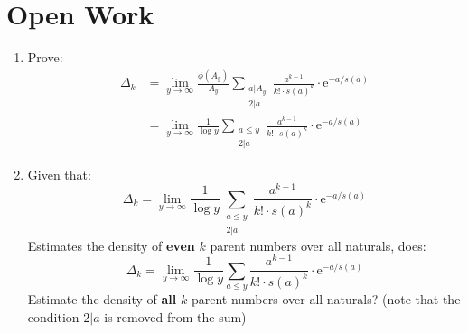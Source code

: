 \documentclass{article}
\theoremstyle{definition}
\begin{document}
\section{Open Work}
\begin{enumerate}
    \item Prove: \begin{align*}
              \Delta_k & = \lim_{y \to \infty} \frac{\phi(A_y)}{A_y} \sum_{\substack{a | A_y \\ 2 | a}} \frac{a^{k-1}}{k! \cdot s(a)^k} \cdot \text{e}^{-a/s(a)}\\
                       & = \lim_{y \to \infty} \frac{1}{\log y}\sum_{\substack{a\leq y       \\ 2 | a}} \frac{a^{k-1}}{k! \cdot s(a)^k} \cdot \text{e}^{-a/s(a)}
          \end{align*}

    \item Given that: $$\Delta_k = \lim_{y \to \infty} \frac{1}{\log y}\sum_{\substack{a\leq y \\ 2 | a}} \frac{a^{k-1}}{k! \cdot s(a)^k} \cdot \text{e}^{-a/s(a)}$$
          Estimates the density of \textbf{even} $k$ parent numbers over all naturals, does:$$\Delta_k = \lim_{y \to \infty} \frac{1}{\log y}\sum_{a\leq y} \frac{a^{k-1}}{k! \cdot s(a)^k} \cdot \text{e}^{-a/s(a)}$$ Estimate the density of \textbf{all} $k$-parent numbers over all naturals? (note that the condition $2|a$ is removed from the sum)
\end{enumerate}



\end{document}
